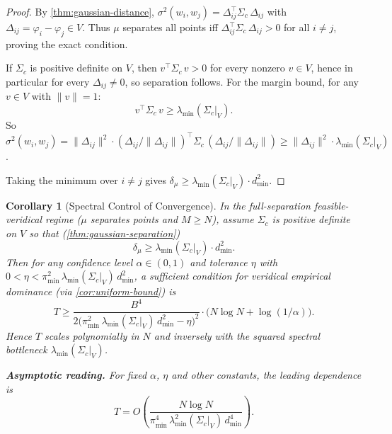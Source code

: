 \documentclass[12pt]{article}
\newtheorem{corollary}[theorem]{Corollary}
\newcommand{\dmu}{\delta_\mu}
\newcommand{\pimin}{\pi_{\min}}
\newcommand{\sigmasq}{\sigma^2}
\begin{document}
\begin{proof}
By \cref{thm:gaussian-distance}, $\sigmasq(w_i, w_j) = \Delta_{ij}^\top \Sigma_c\, \Delta_{ij}$ with $\Delta_{ij} = \varphi_i - \varphi_j \in V$. Thus $\mu$ separates all points iff $\Delta_{ij}^\top \Sigma_c\, \Delta_{ij} > 0$ for all $i \ne j$, proving the exact condition.

If $\Sigma_c$ is positive definite on $V$, then $v^\top \Sigma_c\, v > 0$ for every nonzero $v \in V$, hence in particular for every $\Delta_{ij} \ne 0$, so separation follows. For the margin bound, for any $v \in V$ with $\|v\| = 1$:
\[
v^\top \Sigma_c\, v \ge \lambda_{\min}(\Sigma_c|_V).
\]
So $\sigmasq(w_i, w_j) = \|\Delta_{ij}\|^2 \cdot (\Delta_{ij}/\|\Delta_{ij}\|)^\top \Sigma_c\, (\Delta_{ij}/\|\Delta_{ij}\|) \ge \|\Delta_{ij}\|^2 \cdot \lambda_{\min}(\Sigma_c|_V)$.

Taking the minimum over $i \ne j$ gives $\dmu \ge \lambda_{\min}(\Sigma_c|_V) \cdot d^2_{\min}$.
\end{proof}

\begin{corollary}[Spectral Control of Convergence]\label{cor:spectral}
In the full-separation feasible-veridical regime ($\mu$ separates points and $M \ge N$), assume $\Sigma_c$ is positive definite on $V$ so that (\cref{thm:gaussian-separation})
\[
\dmu \ge \lambda_{\min}(\Sigma_c|_V) \cdot d^2_{\min}.
\]
Then for any confidence level $\alpha \in (0,1)$ and tolerance $\eta$ with $0 < \eta < \pimin^2\, \lambda_{\min}(\Sigma_c|_V)\, d^2_{\min}$, a sufficient condition for veridical empirical dominance (via \cref{cor:uniform-bound}) is
\begin{equation}\label{eq:spectral-T}
T \ge \frac{B^4}{2\bigl(\pimin^2\, \lambda_{\min}(\Sigma_c|_V)\, d^2_{\min} - \eta\bigr)^2} \cdot \bigl(N \log N + \log(1/\alpha)\bigr).
\end{equation}
Hence $T$ scales polynomially in $N$ and inversely with the squared spectral bottleneck $\lambda_{\min}(\Sigma_c|_V)$.

\textbf{Asymptotic reading.} For fixed $\alpha$, $\eta$ and other constants, the leading dependence is
\begin{equation}
T = O\!\left(\frac{N \log N}{\pimin^4\, \lambda_{\min}^2(\Sigma_c|_V)\, d^4_{\min}}\right).
\end{equation}
\end{corollary}
\end{document}
